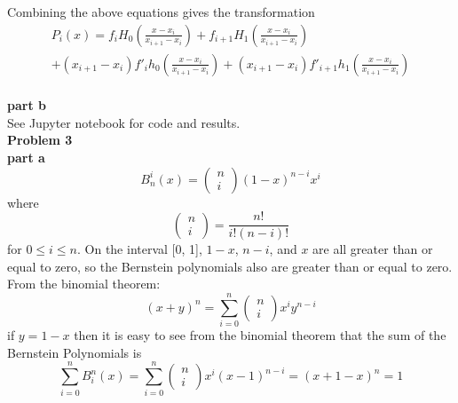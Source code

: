 \documentclass{article} %
\begin{document}
Combining the above equations gives the transformation
\begin{multline*}
P_i(x) = f_i H_0(\frac{x - x_i}{x_{i+1} - x_i}) + f_{i+1} H_1 (\frac{x - x_i}{x_{i+1} - x_i}) \\
+ (x_{i+1} - x_i) f'_i h_0(\frac{x - x_i}{x_{i+1} - x_i}) + (x_{i+1} - x_i) f'_{i+1} h_1(\frac{x - x_i}{x_{i+1} - x_i})
\end{multline*}
\\

\textbf{part b} \\
See Jupyter notebook for code and results.
\\


\textbf{Problem 3} \\

\textbf{part a} \\
\begin{equation*}
B_n^i(x) = \begin{pmatrix} n \\ i \end{pmatrix} (1-x)^{n-i}x^i
\end{equation*}
where 
\begin{equation*}
\begin{pmatrix} n \\ i \end{pmatrix} = \frac{n!}{i!(n-i)!}
\end{equation*}
for $0 \leq i \leq n$.  On the interval [0, 1], $1 - x$, $n-i$, and $x$ are all greater than or equal to zero, so the Bernstein polynomials also are greater than or equal to zero. \\
From the binomial theorem:
\begin{equation*}
(x+y)^n = \sum_{i=0}^n \begin{pmatrix} n \\ i \end{pmatrix} x^i y^{n-i}
\end{equation*}
if $y = 1 - x$ then it is easy to see from the binomial theorem that the sum of the Bernstein Polynomials is
\begin{equation*}
\sum_{i=0}^n B_i^n(x)=\sum_{i=0}^n \begin{pmatrix} n \\ i \end{pmatrix} x^i (x-1)^{n-i} = (x + 1 - x)^n = 1
\end{equation*}
\\
\end{document}
